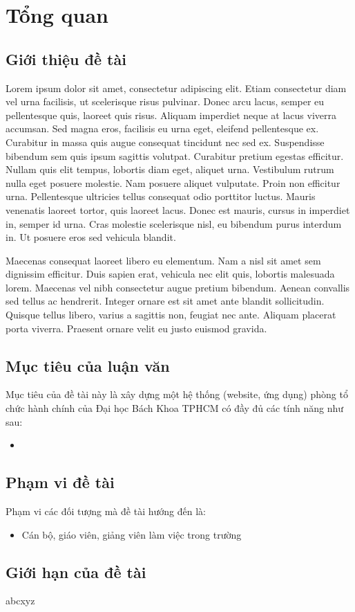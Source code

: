 \section{Tổng quan}
\subsection{Giới thiệu đề tài}
Lorem ipsum dolor sit amet, consectetur adipiscing elit. Etiam consectetur diam vel urna facilisis, ut scelerisque risus pulvinar. Donec arcu lacus, semper eu pellentesque quis, laoreet quis risus. Aliquam imperdiet neque at lacus viverra accumsan. Sed magna eros, facilisis eu urna eget, eleifend pellentesque ex. Curabitur in massa quis augue consequat tincidunt nec sed ex. Suspendisse bibendum sem quis ipsum sagittis volutpat. Curabitur pretium egestas efficitur. Nullam quis elit tempus, lobortis diam eget, aliquet urna. Vestibulum rutrum nulla eget posuere molestie. Nam posuere aliquet vulputate. Proin non efficitur urna. Pellentesque ultricies tellus consequat odio porttitor luctus. Mauris venenatis laoreet tortor, quis laoreet lacus. Donec est mauris, cursus in imperdiet in, semper id urna. Cras molestie scelerisque nisl, eu bibendum purus interdum in. Ut posuere eros sed vehicula blandit.

Maecenas consequat laoreet libero eu elementum. Nam a nisl sit amet sem dignissim efficitur. Duis sapien erat, vehicula nec elit quis, lobortis malesuada lorem. Maecenas vel nibh consectetur augue pretium bibendum. Aenean convallis sed tellus ac hendrerit. Integer ornare est sit amet ante blandit sollicitudin. Quisque tellus libero, varius a sagittis non, feugiat nec ante. Aliquam placerat porta viverra. Praesent ornare velit eu justo euismod gravida.
\subsection{Mục tiêu của luận văn}
Mục tiêu của đề tài này là xây dựng một hệ thống (website, ứng dụng) phòng tổ chức hành chính của Đại học Bách Khoa TPHCM có đầy đủ các tính năng như sau:
\begin{itemize}
    \item 
\end{itemize}
\subsection{Phạm vi đề tài}
Phạm vi các đối tượng mà đề tài hướng đến là:
\begin{itemize}
    \item Cán bộ, giáo viên, giảng viên làm việc trong trường
\end{itemize}
\subsection{Giới hạn của đề tài}
abcxyz
